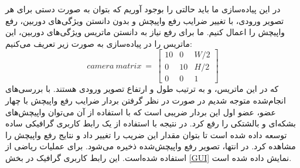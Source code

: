 در این پیاده‌سازی ما باید حالتی را بوجود آوریم که بتوان به صورت دستی برای هر تصویر ورودی، با تغییر ضرایب رفع واپیچش و بدون دانستن ویژگی‌های دوربین، رفع واپیچش را اعمال کنیم. ما برای رفع نیاز به دانستن ماتریس ویژگی‌های دوربین، این ماتریس را در پیاده‌سازی به صورت زیر تعریف می‌کنیم:
\begin{equation}
	camera\ matrix\ =\ \begin{bmatrix}
		10 & 0 & W/2 \\
		0 & 10 & H/2 \\
		0 & 0 & 1
	\end{bmatrix}
\end{equation}
که در این ماتریس،  و  به ترتیب طول و ارتفاع تصویر ورودی هستند. با بررسی‌های انجام‌شده متوجه شدیم در صورت در نظر گرفتن بردار ضرایب رفع واپیچش با چهار عضو، عضو اول این بردار ضریبی است که با استفاده از آن می‌توان واپیچش‌های بشکه‌ای و بالشتکی را رفع کرد. در نتیجه با استفاده از  یک رابط کاربری گرافیکی ساده توسعه داده شده است تا بتوان مقدار این ضریب را تغییر داد و نتایج رفع واپیچش را مشاهده کرد. در انتها، تصویر رفع واپیچش‌شده ذخیره می‌شود. برای عملیات ریاضی از   استفاده شده‌است. این رابط کاربری گرافیک در بخش \ref{GUI} نمایش داده شده است.
